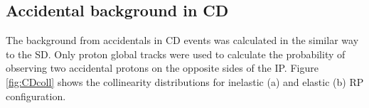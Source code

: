 \subsection{Accidental background in CD}
The background from accidentals in CD events was calculated in the similar way to the SD. Only proton global tracks were used to calculate the probability of observing two accidental protons on the opposite sides of the IP. Figure \ref{fig:CDcoll} shows the collinearity distributions for inelastic (a) and elastic (b) RP configuration. 
\begin{figure}[H]
	\centering
	\parbox{0.48\textwidth}{
		\centering
		\begin{subfigure}[b]{\linewidth}{
				}
		\end{subfigure}
	}
	\quad
	\parbox{0.48\textwidth}{
		\centering
		\begin{subfigure}[b]{\linewidth}{
				}

\end{subfigure}}
\end{figure}
